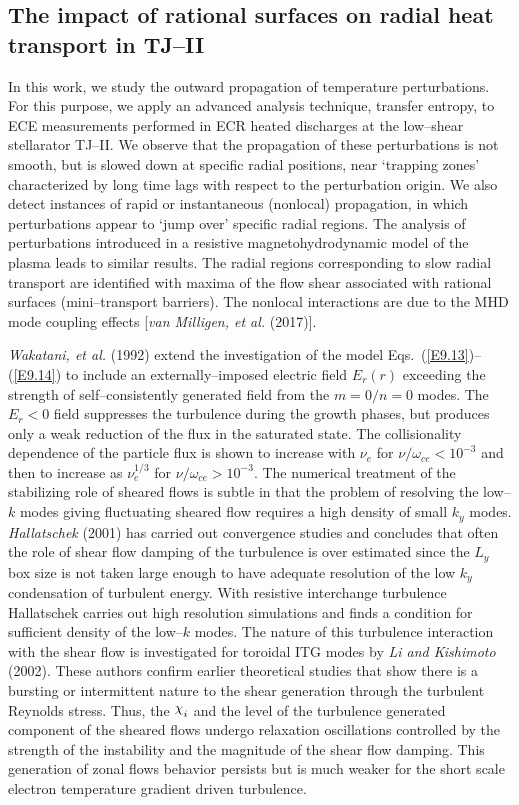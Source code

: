 \documentclass[a4paper,openany,12pt]{book}
\def\chix{\raise.5ex\hbox{$\chi$}}
\begin{document}
\subsection{The impact of rational surfaces on radial heat transport in TJ--II}

In this work, we study the outward propagation of temperature perturbations. For this purpose, we apply an advanced analysis technique, transfer entropy, to ECE measurements performed in ECR heated discharges at the low--shear stellarator TJ--II. We observe that the propagation of these perturbations is not smooth, but is slowed down at specific radial positions, near `trapping zones' characterized by long time lags with respect to the perturbation origin. We also detect instances of rapid or instantaneous (nonlocal) propagation, in which perturbations appear to `jump over' specific radial regions. The analysis of perturbations introduced in a resistive magnetohydrodynamic model of the plasma leads to similar results. The radial regions corresponding to slow radial transport are identified with maxima of the flow shear associated with rational surfaces (mini--transport barriers). The nonlocal interactions are due to the MHD mode coupling effects [\emph{van Milligen, et al.} (2017)].

\emph{Wakatani, et al.} (1992) extend the investigation of the model Eqs.~(\ref{E9.13})--(\ref{E9.14}) to include an externally--imposed electric field $E_r(r)$ exceeding the strength of self--consistently generated field from the $m=0/n=0$ modes. The $E_r<0$ field suppresses the turbulence during the growth phases, but produces only a weak reduction of the flux in the saturated state. The collisionality dependence of the particle flux is shown to increase with $\nu_e$ for $\nu/\omega_{ce}<10^{-3}$ and then to increase as $\nu_e^{1/3}$ for $\nu/\omega_{ce}>10^{-3}$. The numerical treatment of the stabilizing role of sheared flows is subtle in that the problem of resolving the low--$k$ modes giving fluctuating sheared flow requires a high density of small $k_y$ modes. \emph{Hallatschek} (2001) has carried out convergence studies and concludes that often the role of shear flow damping of the turbulence is over estimated since the $L_y$ box size is not taken large enough to have adequate resolution of the low $k_y$ condensation of turbulent energy. With resistive interchange turbulence Hallatschek carries out high resolution simulations and finds a condition for sufficient density of the low--$k$ modes. The nature of this turbulence interaction with the shear flow is investigated for toroidal ITG modes by \emph{Li and Kishimoto} (2002). These authors confirm earlier theoretical studies that show there is a bursting or intermittent nature to the shear generation through the turbulent Reynolds stress. Thus, the $\chix_i$ and the level of the turbulence generated component of the sheared flows undergo relaxation oscillations controlled by the strength of the instability and the magnitude of the shear flow damping. This generation of zonal flows behavior persists but is much weaker for the short scale electron temperature gradient driven turbulence.
\end{document}
